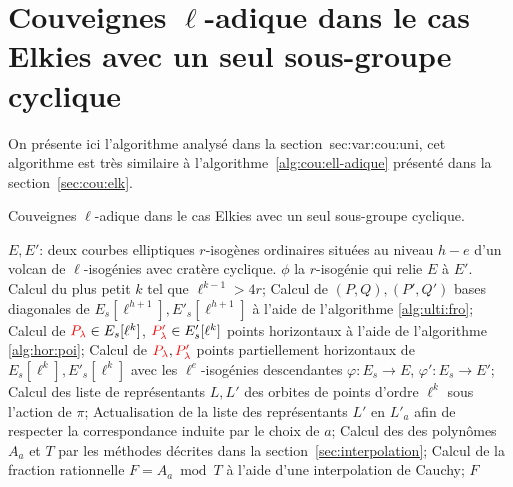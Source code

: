 \documentclass[10pt,a4paper]{book}
\theoremstyle{plain}
\theoremstyle{definition}
\theoremstyle{definition}
\theoremstyle{definition}
\theoremstyle{definition}
\theoremstyle{remark}
\theoremstyle{remark}
\theoremstyle{definition}
\begin{document}
\section{Couveignes $\ell$-adique dans le cas Elkies avec un seul sous-groupe cyclique}
On présente ici l'algorithme analysé dans la section~{sec:var:cou:uni}, cet 
algorithme est très similaire à l'algorithme~\ref{alg:cou:ell-adique} présenté 
dans la section~\ref{sec:cou:elk}.
\begin{algorithm}
\caption{\label{alg:app:cou:var} Couveignes $\ell$-adique dans le cas Elkies avec un seul sous-groupe cyclique.}
\begin{algorithmic}[1]
\REQUIRE $E,E'$: deux courbes elliptiques $r$-isogènes ordinaires situées au niveau $h-e$ d'un volcan de $\ell$-isogénies avec cratère cyclique.
\ENSURE $\phi$ la $r$-isogénie qui relie $E$ à $E'$.
\STATE Calcul du plus petit $k$ tel que $\ell^{k-1}>4r$;
\STATE  
Calcul de $(P,Q),(P',Q')$ bases diagonales de $E_s[\ell^{h+1}],E'_s[\ell^{h+1}]$ à l'aide de l'algorithme \ref{alg:ulti:fro};
\STATE Calcul de $\color{red}P_{\lambda}\color{black} \in E_s[\ell^k]$, $\color{red}P'_{\lambda}\color{black} \in E_s'[\ell^k]$ points horizontaux  à l'aide de l'algorithme \ref{alg:hor:poi};
\STATE 
Calcul de $\color{red}P_{\lambda}\color{black},\color{red}P'_{\lambda}\color{black}$ points partiellement horizontaux de $E_s[\ell^k],E'_s[\ell^k]$ avec les $\ell^e$-isogénies descendantes $\varphi: E_s \rightarrow E$, $\varphi': E_s \rightarrow E'$;
\ENDIF
\STATE Calcul des liste de représentants $L,L'$ des orbites de points d'ordre $\ell^k$ sous l'action de $\pi$;
\STATE Actualisation de la liste des représentants $L'$ en $L'_{a}$ afin de respecter la correspondance induite par le choix de $a$;
\STATE Calcul des des polynômes $A_{a}$ et $T$ par les méthodes décrites dans la section~\ref{sec:interpolation};
\STATE Calcul de la fraction rationnelle $F=A_{a} \bmod T$ à l'aide d'une interpolation de Cauchy;
\RETURN $F$
\ENDIF
\ENDFOR 
\end{algorithmic}
\end{algorithm}
\end{document}
